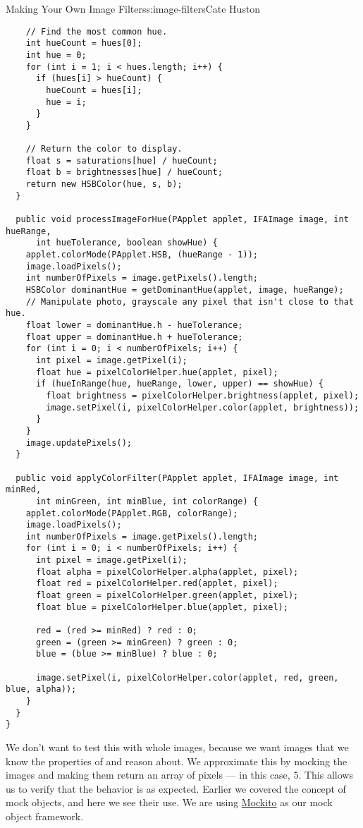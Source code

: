 \begin{aosachapter}{Making Your Own Image Filters}{s:image-filters}{Cate Huston}
\begin{verbatim}
    // Find the most common hue.
    int hueCount = hues[0];
    int hue = 0;
    for (int i = 1; i < hues.length; i++) {
      if (hues[i] > hueCount) {
        hueCount = hues[i];
        hue = i;
      }
    }

    // Return the color to display.
    float s = saturations[hue] / hueCount;
    float b = brightnesses[hue] / hueCount;
    return new HSBColor(hue, s, b);
  }

  public void processImageForHue(PApplet applet, IFAImage image, int hueRange,
      int hueTolerance, boolean showHue) {
    applet.colorMode(PApplet.HSB, (hueRange - 1));
    image.loadPixels();
    int numberOfPixels = image.getPixels().length;
    HSBColor dominantHue = getDominantHue(applet, image, hueRange);
    // Manipulate photo, grayscale any pixel that isn't close to that hue.
    float lower = dominantHue.h - hueTolerance;
    float upper = dominantHue.h + hueTolerance;
    for (int i = 0; i < numberOfPixels; i++) {
      int pixel = image.getPixel(i);
      float hue = pixelColorHelper.hue(applet, pixel);
      if (hueInRange(hue, hueRange, lower, upper) == showHue) {
        float brightness = pixelColorHelper.brightness(applet, pixel);
        image.setPixel(i, pixelColorHelper.color(applet, brightness));
      }
    }
    image.updatePixels();
  }

  public void applyColorFilter(PApplet applet, IFAImage image, int minRed,
      int minGreen, int minBlue, int colorRange) {
    applet.colorMode(PApplet.RGB, colorRange);
    image.loadPixels();
    int numberOfPixels = image.getPixels().length;
    for (int i = 0; i < numberOfPixels; i++) {
      int pixel = image.getPixel(i);
      float alpha = pixelColorHelper.alpha(applet, pixel);
      float red = pixelColorHelper.red(applet, pixel);
      float green = pixelColorHelper.green(applet, pixel);
      float blue = pixelColorHelper.blue(applet, pixel);

      red = (red >= minRed) ? red : 0;
      green = (green >= minGreen) ? green : 0;
      blue = (blue >= minBlue) ? blue : 0;

      image.setPixel(i, pixelColorHelper.color(applet, red, green, blue, alpha));
    }
  }
}
\end{verbatim}

We don't want to test this with whole images, because we want images
that we know the properties of and reason about. We approximate this by
mocking the images and making them return an array of pixels --- in this
case, 5. This allows us to verify that the behavior is as expected.
Earlier we covered the concept of mock objects, and here we see their
use. We are using
\href{http://docs.mockito.googlecode.com/hg/org/mockito/Mockito.html}{Mockito}
as our mock object framework.


\end{aosachapter}
